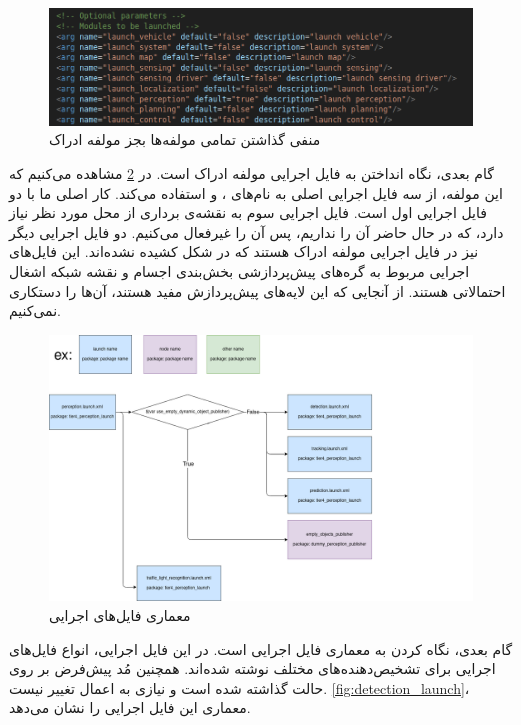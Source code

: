\begin{figure}[h!]
    \centering
    \includegraphics[width=0.75\linewidth]{figures/autoware_launch_settings.png}
    \caption{منفی گذاشتن تمامی مولفه‌ها بجز مولفه ادراک}
    \label{fig:Autoware_Launch_Settings}
\end{figure}

گام بعدی، نگاه انداختن به فایل اجرایی مولفه ادراک است. در \cref{fig:Autoware_Perception_Launch} مشاهده می‌کنیم که این مولفه، از سه فایل اجرایی اصلی به نام‌های ،  و  استفاده می‌کند. کار اصلی ما با دو فایل اجرایی اول است. فایل اجرایی سوم  به نقشه‌ی برداری از محل مورد نظر نیاز دارد، که در حال حاضر آن را نداریم، پس آن را غیرفعال می‌کنیم. دو فایل اجرایی دیگر نیز در فایل اجرایی مولفه ادراک هستند که در شکل کشیده نشده‌اند. این فایل‌های اجرایی مربوط به گره‌های پیش‌پردازشی بخش‌بندی اجسام و نقشه شبکه اشغال احتمالاتی هستند. از آنجایی که این لایه‌های پیش‌پردازش مفید هستند، آن‌ها را دستکاری نمی‌کنیم.

\begin{figure}[h!]
    \centering
    \includegraphics[width=0.75\linewidth]{figures/Autoware_Perception_Launch.png}
    \caption{معماری فایل‌های اجرایی \cite{Autoware_Universe:Documentation}}
    \label{fig:Autoware_Perception_Launch}
\end{figure}

گام بعدی، نگاه کردن به معماری فایل اجرایی  است. در این فایل اجرایی، انواع فایل‌های اجرایی برای تشخیص‌دهنده‌های مختلف نوشته شده‌اند. همچنین مُد پیش‌فرض بر روی حالت  گذاشته شده است و نیازی به اعمال تغییر نیست. \cref{fig:detection_launch}، معماری این فایل اجرایی را نشان می‌دهد.

